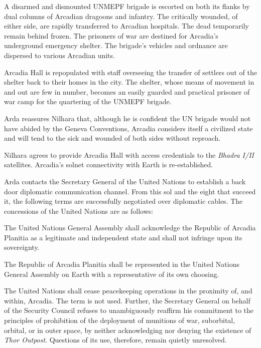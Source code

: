 

A disarmed and dismounted UNMEPF brigade is escorted on both its flanks by dual columns of Arcadian dragoons and infantry. The critically wounded, of either side, are rapidly transferred to Arcadian hospitals. The dead temporarily remain behind frozen. The prisoners of war are destined for Arcadia's underground emergency shelter. The brigade's vehicles and ordnance are dispersed to various Arcadian units.

Arcadia Hall is repopulated with staff overseeing the transfer of settlers out of the shelter back to their homes in the city. The shelter, whose means of movement in and out are few in number, becomes an easily guarded and practical prisoner of war camp for the quartering of the UNMEPF brigade.

Arda reassures Nilhara that, although he is confident the UN brigade would not have abided by the Geneva Conventions, Arcadia considers itself a civilized state and will tend to the sick and wounded of both sides without reproach.
\StopTimelineDate

Nilhara agrees to provide Arcadia Hall with access credentials to the {\it Bhadra I/II} satellites. Arcadia's solnet connectivity with Earth is re-established.

Arda contacts the Secretary General of the United Nations to establish a back door diplomatic communication channel. From this sol and the eight that succeed it, the following terms are successfully negotiated over diplomatic cables. The concessions of the United Nations are as follows:

\startitemize[n]
\item The United Nations General Assembly shall acknowledge the Republic of Arcadia Planitia as a legitimate and independent state and shall not infringe upon its sovereignty.

\item The Republic of Arcadia Planitia shall be represented in the United Nations General Assembly on Earth with a representative of its own choosing.

\item The United Nations shall cease peacekeeping operations in the proximity of, and within, Arcadia. The term  is not used. Further, the Secretary General on behalf of the Security Council refuses to unambiguously reaffirm his commitment to the principles of prohibition of the deployment of munitions of war, suborbital, orbital, or in outer space, by neither acknowledging nor denying the existence of {\it Thor Outpost}. Questions of its use, therefore, remain quietly unresolved.
\stopitemize

